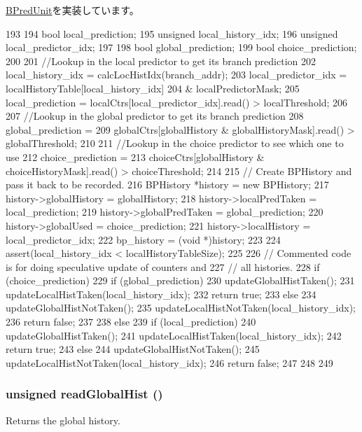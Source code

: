 \hyperlink{classBPredUnit_a5632fdea0abc34f7d68d8445a7a6c166}{BPredUnit}を実装しています。


\begin{DoxyCode}
193 {
194     bool local_prediction;
195     unsigned local_history_idx;
196     unsigned local_predictor_idx;
197 
198     bool global_prediction;
199     bool choice_prediction;
200 
201     //Lookup in the local predictor to get its branch prediction
202     local_history_idx = calcLocHistIdx(branch_addr);
203     local_predictor_idx = localHistoryTable[local_history_idx]
204         & localPredictorMask;
205     local_prediction = localCtrs[local_predictor_idx].read() > localThreshold;
206 
207     //Lookup in the global predictor to get its branch prediction
208     global_prediction =
209       globalCtrs[globalHistory & globalHistoryMask].read() > globalThreshold;
210 
211     //Lookup in the choice predictor to see which one to use
212     choice_prediction =
213       choiceCtrs[globalHistory & choiceHistoryMask].read() > choiceThreshold;
214 
215     // Create BPHistory and pass it back to be recorded.
216     BPHistory *history = new BPHistory;
217     history->globalHistory = globalHistory;
218     history->localPredTaken = local_prediction;
219     history->globalPredTaken = global_prediction;
220     history->globalUsed = choice_prediction;
221     history->localHistory = local_predictor_idx;
222     bp_history = (void *)history;
223 
224     assert(local_history_idx < localHistoryTableSize);
225 
226     // Commented code is for doing speculative update of counters and
227     // all histories.
228     if (choice_prediction) {
229         if (global_prediction) {
230             updateGlobalHistTaken();
231             updateLocalHistTaken(local_history_idx);
232             return true;
233         } else {
234             updateGlobalHistNotTaken();
235             updateLocalHistNotTaken(local_history_idx);
236             return false;
237         }
238     } else {
239         if (local_prediction) {
240             updateGlobalHistTaken();
241             updateLocalHistTaken(local_history_idx);
242             return true;
243         } else {
244             updateGlobalHistNotTaken();
245             updateLocalHistNotTaken(local_history_idx);
246             return false;
247         }
248     }
249 }
\end{DoxyCode}
\hypertarget{classTournamentBP_a0024022d02f61b8c4166f8ea91c0e112}{
\subsubsection[{readGlobalHist}]{\setlength{\rightskip}{0pt plus 5cm}unsigned readGlobalHist ()}}
\label{classTournamentBP_a0024022d02f61b8c4166f8ea91c0e112}
Returns the global history. 


